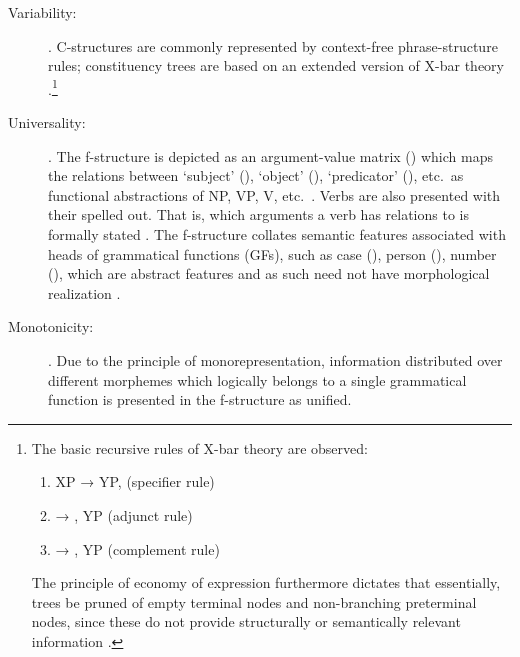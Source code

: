 \begin{description}
\item[Variability:] . 
C-structures are commonly represented by context-free phrase-structure rules; 
constituency trees are based on an extended version of X-bar theory 
\citep[42]{bresnan2016}.\footnote{The basic recursive rules of X-bar theory 
are observed:
\begin{enumerate}[nosep, leftmargin={2\footnotemargin}]
\item XP → YP,  (specifier rule)
\item {} → , YP (adjunct rule)
\item {} → , YP (complement rule)
\end{enumerate}

The principle of economy of expression furthermore dictates that essentially, 
trees be pruned of empty terminal nodes and non-branching preterminal nodes, 
since these do not provide structurally or semantically relevant information 
\citep[119--128]{bresnan2016}.}

\item[Universality:] . The f-structure is depicted
as an argument-value matrix (\Avm{}) which maps the relations between `subject'
(\Sbj{}), `object' (\Obj{}), `predicator' (\Pred{}), etc.\ as functional
abstractions of NP, VP, V, etc.\ \citep[42]{bresnan2016}. Verbs are also
presented with their  spelled out. That is, which arguments a
verb has relations to is formally stated \citep[15]{bresnan2016}. The
f-structure collates semantic features associated with heads of grammatical
functions (GFs), such as case (\Case{}), person (\Pers{}), number (\Num{}),
which are abstract features and as such need not have morphological realization
\citep[43]{bresnan2016}.

\item[Monotonicity:] . Due to the principle of monorepresentation, information
distributed over different morphemes which logically belongs to a single
grammatical function is presented in the f-structure as unified.

\end{description}

